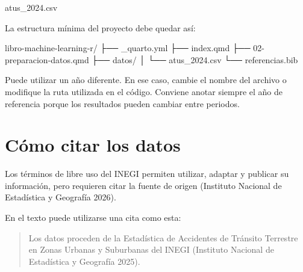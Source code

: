 \documentclass[
  spanish,
  10.5pt,
  letterpaper,
  openany,
  headings=big]{scrbook}
\newenvironment{Shaded}{}{}
\newcommand{\NormalTok}[1]{\textcolor[rgb]{0.14,0.16,0.18}{#1}}
\begin{document}
\begin{Shaded}
\begin{Highlighting}[]
\NormalTok{atus\_2024.csv}
\end{Highlighting}
\end{Shaded}

La estructura mínima del proyecto debe quedar así:

\begin{Shaded}
\begin{Highlighting}[]
\NormalTok{libro{-}machine{-}learning{-}r/}
\NormalTok{├── \_quarto.yml}
\NormalTok{├── index.qmd}
\NormalTok{├── 02{-}preparacion{-}datos.qmd}
\NormalTok{├── datos/}
\NormalTok{│   └── atus\_2024.csv}
\NormalTok{└── referencias.bib}
\end{Highlighting}
\end{Shaded}

\begin{tcolorbox}[enhanced jigsaw, arc=.35mm, bottomrule=.15mm, bottomtitle=1mm, breakable, colback=white, colbacktitle=quarto-callout-tip-color!10!white, colframe=quarto-callout-tip-color-frame, coltitle=black, left=2mm, leftrule=.75mm, opacityback=0, opacitybacktitle=0.6, rightrule=.15mm, title=\textcolor{quarto-callout-tip-color}{\faLightbulb}\hspace{0.5em}{Otro año de información}, titlerule=0mm, toprule=.15mm, toptitle=1mm]

Puede utilizar un año diferente. En ese caso, cambie el nombre del
archivo o modifique la ruta utilizada en el código. Conviene anotar
siempre el año de referencia porque los resultados pueden cambiar entre
periodos.

\end{tcolorbox}

\section{Cómo citar los datos}\label{cuxf3mo-citar-los-datos}

Los términos de libre uso del INEGI permiten utilizar, adaptar y
publicar su información, pero requieren citar la fuente de origen
(Instituto Nacional de Estadística y Geografía 2026).

En el texto puede utilizarse una cita como esta:

\begin{quote}
Los datos proceden de la Estadística de Accidentes de Tránsito Terrestre
en Zonas Urbanas y Suburbanas del INEGI (Instituto Nacional de
Estadística y Geografía 2025).
\end{quote}
\end{document}
